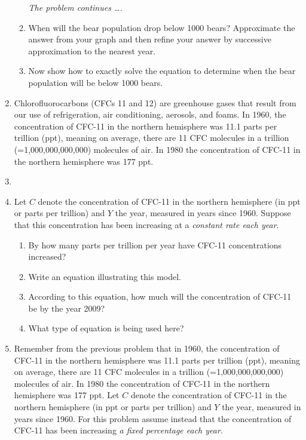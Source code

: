 \documentclass[12pt]{article}
\begin{document}
\begin{enumerate}
\begin{enumerate}
\newpage
\hspace{-.5 in}\emph{The problem continues \ldots.}

\item When will the bear population drop below 1000 bears?  Approximate the answer from your graph and then refine your answer by successive approximation to the nearest year.
\vfill
\item Now show how to exactly solve the equation to determine when the bear population will be below 1000 bears.
\vfill
\end{enumerate}


\newpage

\item Chlorofluorocarbons (CFCs 11 and 12) are greenhouse gases that result from our use of refrigeration, air conditioning, aerosols, and foams.  In 1960, the concentration of CFC-11 in the northern hemisphere was 11.1 parts per trillion (ppt), meaning on average, there are 11 CFC molecules in a trillion (=1,000,000,000,000) molecules of air.  In 1980 the concentration of CFC-11 in the northern hemisphere was 177 ppt.
\item[]
\item[] Let $C$ denote the concentration of CFC-11 in the northern hemisphere (in ppt or parts per trillion) and $Y$ the year, measured in years since 1960.  Suppose that this concentration has been increasing at a \textit{constant rate each year}.

\begin{enumerate}
\item By how many parts per trillion per year have CFC-11 concentrations increased?
\vfill
\item Write an equation illustrating this model.
\vfill
\item According to this equation, how much will the concentration of CFC-11 be by the year 2009?
\vfill
\item What type of equation is being used here?
\vfill
\end{enumerate}

\newpage

\item  Remember from the previous problem that in 1960, the concentration of CFC-11 in the northern hemisphere was 11.1 parts per trillion (ppt), meaning on average, there are 11 CFC molecules in a trillion (=1,000,000,000,000) molecules of air.  In 1980 the concentration of CFC-11 in the northern hemisphere was 177 ppt.  Let $C$ denote the concentration of CFC-11 in the northern hemisphere (in ppt or parts per trillion) and $Y$ the year, measured in years since 1960.  For this problem assume instead that the concentration of CFC-11 has been increasing \textit{a fixed percentage each year}.


\end{enumerate}
\end{document}
